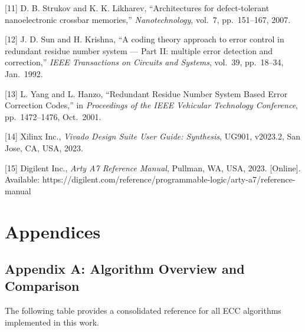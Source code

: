 \documentclass[
  english,
  12pt,
]{report}
\begin{document}
{[}11{]} D. B. Strukov and K. K. Likharev, ``Architectures for
defect-tolerant nanoelectronic crossbar memories,''
\emph{Nanotechnology}, vol.~7, pp.~151--167, 2007.

{[}12{]} J. D. Sun and H. Krishna, ``A coding theory approach to error
control in redundant residue number system --- Part II: multiple error
detection and correction,'' \emph{IEEE Transactions on Circuits and
Systems}, vol.~39, pp.~18--34, Jan.~1992.

{[}13{]} L. Yang and L. Hanzo, ``Redundant Residue Number System Based
Error Correction Codes,'' in \emph{Proceedings of the IEEE Vehicular
Technology Conference}, pp.~1472--1476, Oct.~2001.

{[}14{]} Xilinx Inc., \emph{Vivado Design Suite User Guide: Synthesis},
UG901, v2023.2, San Jose, CA, USA, 2023.

{[}15{]} Digilent Inc., \emph{Arty A7 Reference Manual}, Pullman, WA,
USA, 2023. {[}Online{]}. Available:
https://digilent.com/reference/programmable-logic/arty-a7/reference-manual

\chapter{Appendices}\label{appendices}

\section{Appendix A: Algorithm Overview and
Comparison}\label{appendix-a-algorithm-overview-and-comparison}

The following table provides a consolidated reference for all ECC
algorithms implemented in this work.
\end{document}
